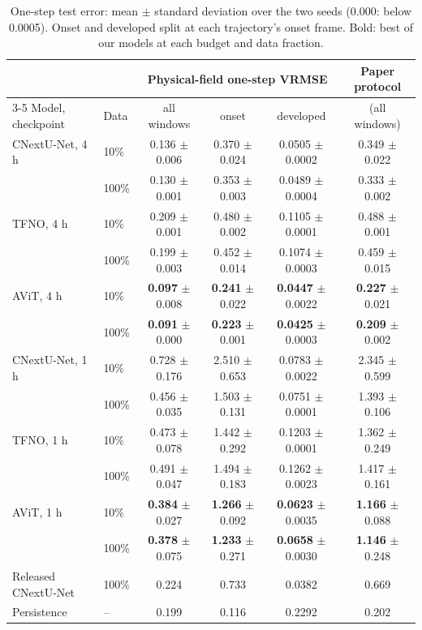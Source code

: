 \documentclass[11pt]{article}
\begin{document}
\begin{table}[tp]
\centering\small
\begin{tabular}{@{}llcccc@{}}
\toprule
& & \multicolumn{3}{c}{Physical-field one-step VRMSE} & Paper protocol \\
\cmidrule(lr){3-5}
Model, checkpoint & Data & all windows & onset & developed & (all windows) \\
\midrule
CNextU-Net, 4 h & 10\% & 0.136 $\pm$ 0.006 & 0.370 $\pm$ 0.024 & 0.0505 $\pm$ 0.0002 & 0.349 $\pm$ 0.022 \\
                & 100\% & 0.130 $\pm$ 0.001 & 0.353 $\pm$ 0.003 & 0.0489 $\pm$ 0.0004 & 0.333 $\pm$ 0.002 \\
TFNO, 4 h & 10\% & 0.209 $\pm$ 0.001 & 0.480 $\pm$ 0.002 & 0.1105 $\pm$ 0.0001 & 0.488 $\pm$ 0.001 \\
          & 100\% & 0.199 $\pm$ 0.003 & 0.452 $\pm$ 0.014 & 0.1074 $\pm$ 0.0003 & 0.459 $\pm$ 0.015 \\
AViT, 4 h & 10\% & \textbf{0.097} $\pm$ 0.008 & \textbf{0.241} $\pm$ 0.022 & \textbf{0.0447} $\pm$ 0.0022 & \textbf{0.227} $\pm$ 0.021 \\
          & 100\% & \textbf{0.091} $\pm$ 0.000 & \textbf{0.223} $\pm$ 0.001 & \textbf{0.0425} $\pm$ 0.0003 & \textbf{0.209} $\pm$ 0.002 \\
\midrule
CNextU-Net, 1 h & 10\% & 0.728 $\pm$ 0.176 & 2.510 $\pm$ 0.653 & 0.0783 $\pm$ 0.0022 & 2.345 $\pm$ 0.599 \\
                & 100\% & 0.456 $\pm$ 0.035 & 1.503 $\pm$ 0.131 & 0.0751 $\pm$ 0.0001 & 1.393 $\pm$ 0.106 \\
TFNO, 1 h & 10\% & 0.473 $\pm$ 0.078 & 1.442 $\pm$ 0.292 & 0.1203 $\pm$ 0.0001 & 1.362 $\pm$ 0.249 \\
          & 100\% & 0.491 $\pm$ 0.047 & 1.494 $\pm$ 0.183 & 0.1262 $\pm$ 0.0023 & 1.417 $\pm$ 0.161 \\
AViT, 1 h & 10\% & \textbf{0.384} $\pm$ 0.027 & \textbf{1.266} $\pm$ 0.092 & \textbf{0.0623} $\pm$ 0.0035 & \textbf{1.166} $\pm$ 0.088 \\
          & 100\% & \textbf{0.378} $\pm$ 0.075 & \textbf{1.233} $\pm$ 0.271 & \textbf{0.0658} $\pm$ 0.0030 & \textbf{1.146} $\pm$ 0.248 \\
\midrule
Released CNextU-Net & 100\% & 0.224 & 0.733 & 0.0382 & 0.669 \\
Persistence & -- & 0.199 & 0.116 & 0.2292 & 0.202 \\
\bottomrule
\end{tabular}
\caption{One-step test error: mean $\pm$ standard deviation over the two seeds (0.000: below 0.0005). Onset and
developed split at each trajectory's onset frame. Bold: best of our models at each budget and data fraction.}
\label{tab:test}
\end{table}
\end{document}

